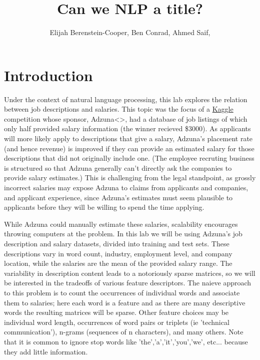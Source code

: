 \documentclass[12pt]{article}
\begin{document}
\title{Can we NLP a title?}

\author{ Elijah Berenstein-Cooper, Ben Conrad, Ahmed Saif, } \maketitle


\section{Introduction} Under the context of natural language processing, this
lab explores the relation between job descriptions and salaries.  This topic
was the focus of a \href{http://www.kaggle.com/c/job-salary-prediction}{Kaggle}
competition whose sponsor, Adzuna<>, had a database of job listings of which
only half provided salary information (the winner recieved \$3000).  As
applicants will more likely apply to descriptions that give a salary, Adzuna's
placement rate (and hence revenue) is improved if they can provide an estimated
salary for those descriptions that did not originally include one.  (The
employee recruting business is structured so that Adzuna generally can't
directly ask the companies to provide salary estimates.) This is challenging
from the legal standpoint, as grossly incorrect salaries may expose Adzuna to
claims from applicants and companies, and applicant experience, since Adzuna's
estimates must seem plausible to applicants before they will be willing to
spend the time applying.

While Adzuna could manually estimate these salaries, scalability encourages
throwing computers at the problem.  In this lab we will be using Adzuna's job
description and salary datasets, divided into training and test sets.  These
descriptions vary in word count, industry, employment level, and company
location, while the salaries are the mean of the provided salary range.  The
variability in description content leads to a notoriously sparse matrices, so
we will be interested in the tradeoffs of various feature descriptors.  The
naieve approach to this problem is to count the occurrences of individual words
and associate them to salaries; here each word is a feature and as there are
many descriptive words the resulting matrices will be sparse.  Other feature
choices may be individual word length, occurrences of word pairs or triplets
(ie 'technical communication'), n-grams (sequences of n characters), and many
others.  Note that it is common to ignore stop words like
'the','a','it','you','we', etc... because they add little information.
\end{document}
